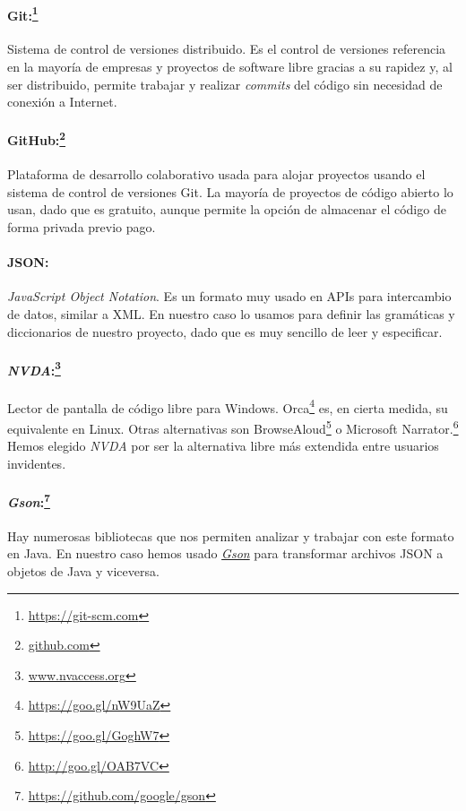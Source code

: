  \paragraph{Git:\protect\footnote{\protect\url{https://git-scm.com}}} Sistema de control de versiones distribuido. Es el control de versiones referencia en la mayoría de empresas y proyectos de software libre gracias a su rapidez y, al ser distribuido, permite trabajar y realizar \textit{commits} del código sin necesidad de conexión a Internet.

 \paragraph{GitHub:\protect\footnote{\url{github.com}}} Plataforma de desarrollo colaborativo usada para alojar proyectos usando el sistema de control de versiones Git. La mayoría de proyectos de código abierto lo usan, dado que es gratuito, aunque permite la opción de almacenar el código de forma privada previo pago.

\paragraph{JSON:} \textit{JavaScript Object Notation}. Es un formato muy usado en APIs para intercambio de datos, similar a XML. En nuestro caso lo usamos para definir las gramáticas y diccionarios de nuestro proyecto, dado que es muy sencillo de leer y especificar.

\paragraph{\textit{NVDA}:\protect\footnote{\protect\url{www.nvaccess.org}}} Lector de pantalla de código libre para Windows. 
Orca\footnote{\url{https://goo.gl/nW9UaZ}} es, en cierta medida, su equivalente en Linux. Otras alternativas son BrowseAloud\footnote{\url{https://goo.gl/GoghW7}} o Microsoft Narrator.\footnote{\url{http://goo.gl/OAB7VC}} Hemos elegido \textit{NVDA} por ser la alternativa libre más extendida entre usuarios invidentes.

\paragraph{\textit{Gson}:\protect\footnote{\protect\url{https://github.com/google/gson}}} Hay numerosas bibliotecas que nos permiten analizar y trabajar con este formato en Java. En nuestro caso hemos usado \href{https://goo.gl/zPCXen}{\textit{Gson}} para transformar archivos JSON a objetos de Java y viceversa.

